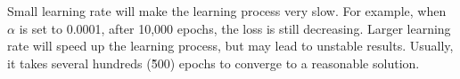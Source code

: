 Small learning rate will make the learning process very slow. For example, when $\alpha$ is set to 0.0001, after 10,000 epochs, the loss is still decreasing. Larger learning rate will speed up the learning process, but may lead to unstable results. Usually, it takes several hundreds (\~500) epochs to converge to a reasonable solution.

